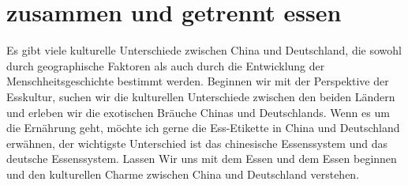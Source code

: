 \section{zusammen und getrennt essen}
\mypar
Es gibt viele kulturelle Unterschiede zwischen China und Deutschland, die sowohl durch geographische Faktoren als auch durch die Entwicklung der Menschheitsgeschichte bestimmt werden. Beginnen wir mit der Perspektive der Esskultur, suchen wir die kulturellen Unterschiede zwischen den beiden Ländern und erleben wir die exotischen Bräuche Chinas und Deutschlands. Wenn es um die Ernährung geht, möchte ich gerne die Ess-Etikette in China und Deutschland erwähnen, der wichtigste Unterschied ist das chinesische Essenssystem und das deutsche Essenssystem. Lassen Wir uns mit dem Essen und dem Essen beginnen und den kulturellen Charme zwischen China und Deutschland verstehen.
\mypar
